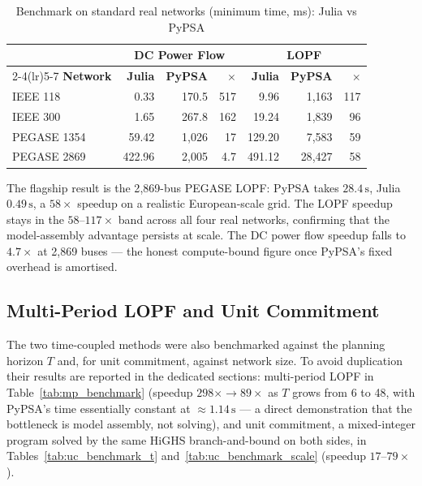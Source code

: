 \begin{table}[H]
\centering
\caption{Benchmark on standard real networks (minimum time, ms): Julia vs PyPSA}
\label{tab:real_benchmark}
\begin{tabular}{lrrrrrr}
\toprule
 & \multicolumn{3}{c}{\textbf{DC Power Flow}} & \multicolumn{3}{c}{\textbf{LOPF}} \\
\cmidrule(lr){2-4}\cmidrule(lr){5-7}
\textbf{Network} & \textbf{Julia} & \textbf{PyPSA} & \textbf{$\times$} & \textbf{Julia} & \textbf{PyPSA} & \textbf{$\times$} \\
\midrule
IEEE 118     &   0.33 &   170.5 & 517 &   9.96 &  1{,}163 & 117 \\
IEEE 300     &   1.65 &   267.8 & 162 &  19.24 &  1{,}839 &  96 \\
PEGASE 1354  &  59.42 & 1{,}026 &  17 & 129.20 &  7{,}583 &  59 \\
PEGASE 2869  & 422.96 & 2{,}005 & 4.7 & 491.12 & 28{,}427 &  58 \\
\bottomrule
\end{tabular}
\end{table}

The flagship result is the 2{,}869-bus PEGASE LOPF: PyPSA takes $28.4\,\text{s}$, Julia $0.49\,\text{s}$, a $58\times$ speedup on a realistic European-scale grid. The LOPF speedup stays in the $58$--$117\times$ band across all four real networks, confirming that the model-assembly advantage persists at scale. The DC power flow speedup falls to $4.7\times$ at 2{,}869 buses --- the honest compute-bound figure once PyPSA's fixed overhead is amortised.

\subsection{Multi-Period LOPF and Unit Commitment}

The two time-coupled methods were also benchmarked against the planning horizon $T$ and, for unit commitment, against network size. To avoid duplication their results are reported in the dedicated sections: multi-period LOPF in Table~\ref{tab:mp_benchmark} (speedup $298\times \to 89\times$ as $T$ grows from 6 to 48, with PyPSA's time essentially constant at $\approx 1.14\,\text{s}$ --- a direct demonstration that the bottleneck is model assembly, not solving), and unit commitment, a mixed-integer program solved by the same HiGHS branch-and-bound on both sides, in Tables~\ref{tab:uc_benchmark_t} and~\ref{tab:uc_benchmark_scale} (speedup $17$--$79\times$).

